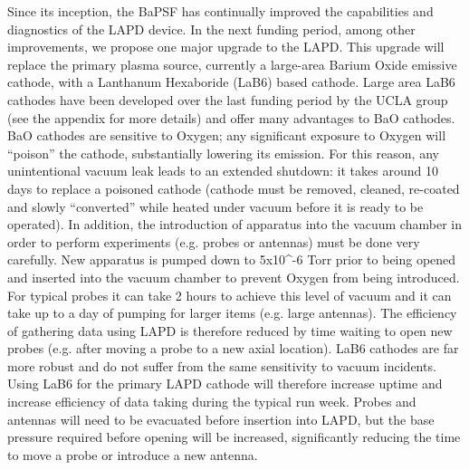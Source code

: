 \documentclass[11pt]{article}
\begin{document}
\begin{description}
Since its inception, the BaPSF has continually improved the capabilities
and diagnostics of the LAPD device. In the next funding period, among
other improvements, we propose one major upgrade to the LAPD. This
upgrade will replace the primary plasma source, currently a large-area
Barium Oxide emissive cathode, with a Lanthanum Hexaboride (LaB6) based
cathode. Large area LaB6 cathodes have been developed over the last
funding period by the UCLA group (see the appendix for more details) and
offer many advantages to BaO cathodes. BaO cathodes are sensitive to
Oxygen; any significant exposure to Oxygen will ``poison'' the cathode,
substantially lowering its emission. For this reason, any unintentional
vacuum leak leads to an extended shutdown: it takes around 10 days to
replace a poisoned cathode (cathode must be removed, cleaned, re-coated
and slowly ``converted'' while heated under vacuum before it is ready to
be operated). In addition, the introduction of apparatus into the vacuum
chamber in order to perform experiments (e.g. probes or antennas) must
be done very carefully. New apparatus is pumped down to 5x10\^{}-6 Torr
prior to being opened and inserted into the vacuum chamber to prevent
Oxygen from being introduced. For typical probes it can take 2 hours to
achieve this level of vacuum and it can take up to a day of pumping for
larger items (e.g. large antennas). The efficiency of gathering data
using LAPD is therefore reduced by time waiting to open new probes (e.g.
after moving a probe to a new axial location). LaB6 cathodes are far
more robust and do not suffer from the same sensitivity to vacuum
incidents. Using LaB6 for the primary LAPD cathode will therefore
increase uptime and increase efficiency of data taking during the
typical run week. Probes and antennas will need to be evacuated before
insertion into LAPD, but the base pressure required before opening will
be increased, significantly reducing the time to move a probe or
introduce a new antenna.


\end{description}
\end{document}

